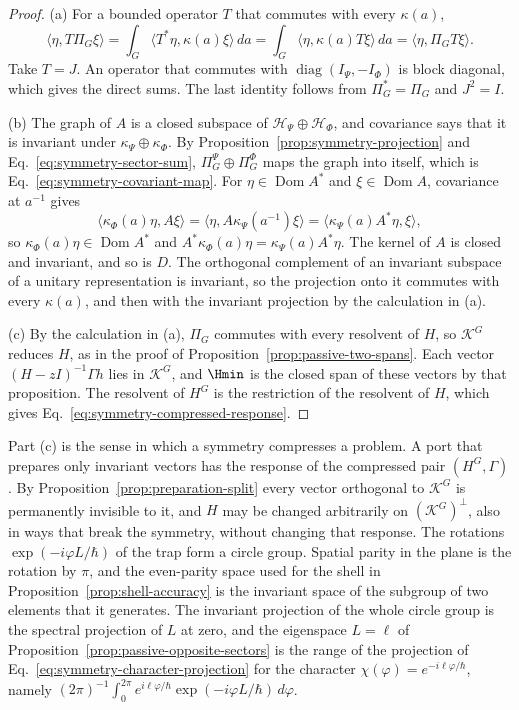 \begin{proof}
(a) For a bounded operator $T$ that commutes with every $\kappa(a)$,
\[
 \langle\eta,T\Pi_G\xi\rangle=\int_G\langle T^*\eta,\kappa(a)\xi\rangle\,da
   =\int_G\langle\eta,\kappa(a)T\xi\rangle\,da=\langle\eta,\Pi_GT\xi\rangle .
\]
Take $T=J$. An operator that commutes with $\operatorname{diag}(I_\Psi,-I_\Phi)$ is block diagonal, which gives the direct sums. The last identity follows from $\Pi_G^*=\Pi_G$ and $J^2=I$.

(b) The graph of $A$ is a closed subspace of $\mathcal H_\Psi\oplus\mathcal H_\Phi$, and covariance says that it is invariant under $\kappa_\Psi\oplus\kappa_\Phi$. By Proposition~\ref{prop:symmetry-projection} and Eq.~\eqref{eq:symmetry-sector-sum}, $\Pi_G^\Psi\oplus\Pi_G^\Phi$ maps the graph into itself, which is Eq.~\eqref{eq:symmetry-covariant-map}. For $\eta\in\operatorname{Dom}A^*$ and $\xi\in\operatorname{Dom}A$, covariance at $a^{-1}$ gives
\[
 \langle\kappa_\Phi(a)\eta,A\xi\rangle=\langle\eta,A\kappa_\Psi(a^{-1})\xi\rangle
   =\langle\kappa_\Psi(a)A^*\eta,\xi\rangle ,
\]
so $\kappa_\Phi(a)\eta\in\operatorname{Dom}A^*$ and $A^*\kappa_\Phi(a)\eta=\kappa_\Psi(a)A^*\eta$. The kernel of $A$ is closed and invariant, and so is $D$. The orthogonal complement of an invariant subspace of a unitary representation is invariant, so the projection onto it commutes with every $\kappa(a)$, and then with the invariant projection by the calculation in (a).

(c) By the calculation in (a), $\Pi_G$ commutes with every resolvent of $H$, so $\mathcal K^G$ reduces $H$, as in the proof of Proposition~\ref{prop:passive-two-spans}. Each vector $(H-zI)^{-1}\Gamma h$ lies in $\mathcal K^G$, and $\Hmin$ is the closed span of these vectors by that proposition. The resolvent of $H^G$ is the restriction of the resolvent of $H$, which gives Eq.~\eqref{eq:symmetry-compressed-response}.
\end{proof}

Part (c) is the sense in which a symmetry compresses a problem. A port that prepares only invariant vectors has the response of the compressed pair $(H^G,\Gamma)$. By Proposition~\ref{prop:preparation-split} every vector orthogonal to $\mathcal K^G$ is permanently invisible to it, and $H$ may be changed arbitrarily on $(\mathcal K^G)^\perp$, also in ways that break the symmetry, without changing that response. The rotations $\exp(-i\varphi L/\hbar)$ of the trap form a circle group. Spatial parity in the plane is the rotation by $\pi$, and the even-parity space used for the shell in Proposition~\ref{prop:shell-accuracy} is the invariant space of the subgroup of two elements that it generates. The invariant projection of the whole circle group is the spectral projection of $L$ at zero, and the eigenspace $L=\ell$ of Proposition~\ref{prop:passive-opposite-sectors} is the range of the projection of Eq.~\eqref{eq:symmetry-character-projection} for the character $\chi(\varphi)=e^{-i\ell\varphi/\hbar}$, namely $(2\pi)^{-1}\int_0^{2\pi}e^{i\ell\varphi/\hbar}\exp(-i\varphi L/\hbar)\,d\varphi$.

